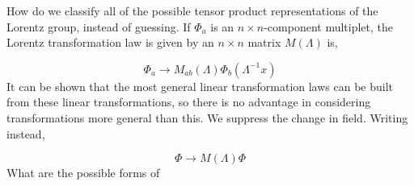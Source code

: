 How do we classify all of the possible tensor product representations of the Lorentz group, instead of guessing. If $\Phi_a$ is an $n\times n$-component multiplet, the Lorentz transformation law is given by an $n\times n$ matrix $M(\Lambda)$ is, 

\begin{equation}
    \Phi_a \rightarrow M_{ab}(\Lambda)\Phi_b(\Lambda^{-1}x)
\end{equation}
It can be shown that the most general linear transformation laws can be built from these linear transformations, so there is no advantage in considering transformations more general than this. We suppress the change in field. Writing instead, 

\begin{equation}
    \Phi \rightarrow M(\Lambda)\Phi
\end{equation}
What are the possible forms of 